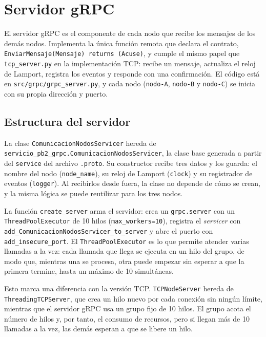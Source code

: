 \section{Servidor gRPC}

El servidor gRPC es el componente de cada nodo que recibe los mensajes de los
demás nodos. Implementa la única función remota que declara el contrato,
\texttt{EnviarMensaje(Mensaje) returns (Acuse)}, y cumple el mismo papel que
\texttt{tcp\_server.py} en la implementación TCP: recibe un mensaje, actualiza
el reloj de Lamport, registra los eventos y responde con una confirmación. El
código está en \texttt{src/grpc/grpc\_server.py}, y cada nodo
(\texttt{nodo-A}, \texttt{nodo-B} y \texttt{nodo-C}) se inicia con su propia
dirección y puerto.

\subsection{Estructura del servidor}

La clase \texttt{ComunicacionNodosServicer} hereda de
\texttt{servicio\_pb2\_grpc.ComunicacionNodosServicer}, la clase base generada
a partir del \texttt{service} del archivo \texttt{.proto}. Su constructor
recibe tres datos y los guarda: el nombre del nodo (\texttt{node\_name}), su
reloj de Lamport (\texttt{clock}) y su registrador de eventos (\texttt{logger}).
Al recibirlos desde fuera, la clase no depende de cómo se crean, y la misma
lógica se puede reutilizar para los tres nodos.

La función \texttt{create\_server} arma el servidor: crea un
\texttt{grpc.server} con un \texttt{ThreadPoolExecutor} de 10 hilos
(\texttt{max\_workers=10}), registra el \emph{servicer} con
\texttt{add\_ComunicacionNodosServicer\_to\_server} y abre el puerto con
\texttt{add\_insecure\_port}. El \texttt{ThreadPoolExecutor} es lo que permite
atender varias llamadas a la vez: cada llamada que llega se ejecuta en un hilo
del grupo, de modo que, mientras una se procesa, otra puede empezar sin esperar
a que la primera termine, hasta un máximo de 10 simultáneas.

Esto marca una diferencia con la versión TCP. \texttt{TCPNodeServer} hereda de
\texttt{ThreadingTCPServer}, que crea un hilo nuevo por cada conexión sin
ningún límite, mientras que el servidor gRPC usa un grupo fijo de 10 hilos. El
grupo acota el número de hilos y, por tanto, el consumo de recursos, pero si
llegan más de 10 llamadas a la vez, las demás esperan a que se libere un
hilo.

